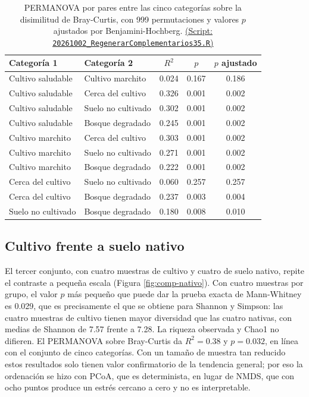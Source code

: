 \begin{table}[H]
\centering
\caption{PERMANOVA por pares entre las cinco categorías sobre la disimilitud de Bray-Curtis, con
999 permutaciones y valores $p$ ajustados por Benjamini-Hochberg. \href{https://github.com/CamilaSilva1995/Tesis_Maestria/blob/main/Analisis_Comparativo/Fresa_Solena/20261002_RegenerarComplementarios35.R}{(Script: \texttt{20261002\_RegenerarComplementarios35.R})}}
\label{tab:comp-pares}
\small
\begin{tabular}{llccc}
\hline
Categoría 1 & Categoría 2 & $R^2$ & $p$ & $p$ ajustado \\
\hline
Cultivo saludable  & Cultivo marchito   & 0.024 & 0.167 & 0.186 \\
Cultivo saludable  & Cerca del cultivo  & 0.326 & 0.001 & 0.002 \\
Cultivo saludable  & Suelo no cultivado & 0.302 & 0.001 & 0.002 \\
Cultivo saludable  & Bosque degradado   & 0.245 & 0.001 & 0.002 \\
Cultivo marchito   & Cerca del cultivo  & 0.303 & 0.001 & 0.002 \\
Cultivo marchito   & Suelo no cultivado & 0.271 & 0.001 & 0.002 \\
Cultivo marchito   & Bosque degradado   & 0.222 & 0.001 & 0.002 \\
Cerca del cultivo  & Suelo no cultivado & 0.060 & 0.257 & 0.257 \\
Cerca del cultivo  & Bosque degradado   & 0.237 & 0.003 & 0.004 \\
Suelo no cultivado & Bosque degradado   & 0.180 & 0.008 & 0.010 \\
\hline
\end{tabular}
\end{table}

\subsection{Cultivo frente a suelo nativo}

El tercer conjunto, con cuatro muestras de cultivo y cuatro de suelo nativo, repite el contraste a
pequeña escala (Figura \ref{fig:comp-nativo}). Con cuatro muestras por grupo, el valor $p$ más
pequeño que puede dar la prueba exacta de Mann-Whitney es 0.029, que es precisamente el que se
obtiene para Shannon y Simpson: las cuatro muestras de cultivo tienen mayor diversidad que las
cuatro nativas, con medias de Shannon de 7.57 frente a 7.28. La riqueza observada y Chao1 no
difieren. El PERMANOVA sobre Bray-Curtis da $R^2 = 0.38$ y $p = 0.032$, en línea con el conjunto de
cinco categorías. Con un tamaño de muestra tan reducido estos resultados solo tienen valor
confirmatorio de la tendencia general; por eso la ordenación se hizo con PCoA, que es determinista,
en lugar de NMDS, que con ocho puntos produce un estrés cercano a cero y no es interpretable.

